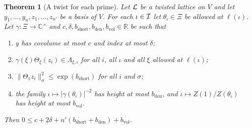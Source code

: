 \documentclass[10pt]{amsart}
\newtheorem{theorem}{Theorem}[section]
\theoremstyle{definition}
\theoremstyle{remark}
\newcommand{\C}{\mathbb C}
\newcommand{\R}{\mathbb R}
\begin{document}
\begin{theorem}[A twist for each prime]\label{au:twistprime}
Let $\mathcal L$ be a twisted lattice on $V$ and let $y_1,\dots,y_n,z_1,\dots,z_{n'}$ be a basis of
$V$. For each $\iota\in\mathcal I$ let $\theta_\iota\in\Xi$ be allowed at $\ell(\iota)$. Let
$\gamma\colon\Xi\to\C^\times$ and $c,\delta,b_{\mathrm{short}},b_{\mathrm{den}},b_{\mathrm{vol}}
\in\R$ be such that
\begin{enumerate}
\item[(i)] $y$ has covolume at most $c$ and index at most $\delta$;
\item[(ii)] $\gamma(\xi)\Theta_\xi(z_i)\in\Lambda_{\xi,\iota}$ for all $i$, all $\iota$ and all
$\xi$ allowed at $\ell(\iota)$;
\item[(iii)] $\|\Theta_1z_i\|_\sigma^2\le\exp(b_{\mathrm{short}})$ for all $i$ and $\sigma$;
\item[(iv)] the family $\iota\mapsto|\gamma(\theta_\iota)|^{-2}$ has height at most
$b_{\mathrm{den}}$, and $\iota\mapsto Z(1)/Z(\theta_\iota)$ has height at most $b_{\mathrm{vol}}$.
\end{enumerate}
Then $0\le c+2\delta+n'(b_{\mathrm{short}}+b_{\mathrm{den}})+b_{\mathrm{vol}}$.
\end{theorem}
\end{document}
